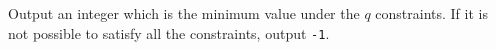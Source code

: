 Output an integer which is the minimum value under the $q$ constraints. 
If it is not possible to satisfy all the constraints, output \verb+-1+.

